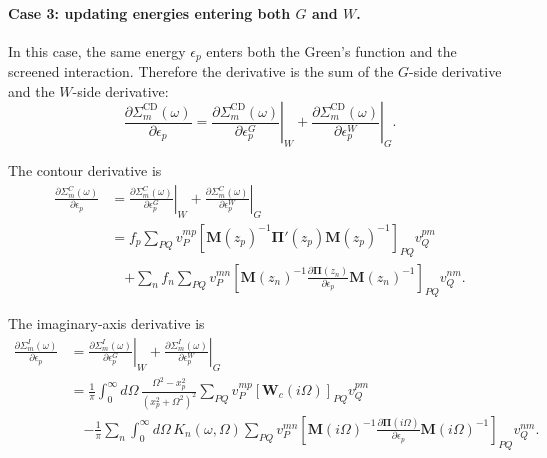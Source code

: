 \paragraph{Case 3: updating energies entering both \(G\) and \(W\).}

In this case, the same energy \(\epsilon_p\) enters both the Green's function
and the screened interaction.  Therefore the derivative is the sum of the
\(G\)-side derivative and the \(W\)-side derivative:
\begin{equation}
    \boxed{
    \frac{\partial \Sigma_m^{\mathrm{CD}}(\omega)}
    {\partial \epsilon_p}
    =
    \left.
    \frac{\partial \Sigma_m^{\mathrm{CD}}(\omega)}
    {\partial \epsilon_p^G}
    \right|_{W}
    +
    \left.
    \frac{\partial \Sigma_m^{\mathrm{CD}}(\omega)}
    {\partial \epsilon_p^W}
    \right|_{G}
    }.
\end{equation}

The contour derivative is
\begin{align}
    \frac{\partial \Sigma_m^C(\omega)}
    {\partial \epsilon_p}
    &=
    \left.
    \frac{\partial \Sigma_m^C(\omega)}
    {\partial \epsilon_p^G}
    \right|_{W}
    +
    \left.
    \frac{\partial \Sigma_m^C(\omega)}
    {\partial \epsilon_p^W}
    \right|_{G} \\
    &=
    \boxed{
    f_p
    \sum_{PQ}
    v_P^{mp}
    \left[
    \mathbf M(z_p)^{-1}
    \boldsymbol{\Pi}'(z_p)
    \mathbf M(z_p)^{-1}
    \right]_{PQ}
    v_Q^{pm}
    } \nonumber \\
    &\quad
    \boxed{
    +
    \sum_n f_n
    \sum_{PQ}
    v_P^{mn}
    \left[
    \mathbf M(z_n)^{-1}
    \frac{\partial \boldsymbol{\Pi}(z_n)}
    {\partial \epsilon_p}
    \mathbf M(z_n)^{-1}
    \right]_{PQ}
    v_Q^{nm}
    }.
\end{align}

The imaginary-axis derivative is
\begin{align}
    \frac{\partial \Sigma_m^I(\omega)}
    {\partial \epsilon_p}
    &=
    \left.
    \frac{\partial \Sigma_m^I(\omega)}
    {\partial \epsilon_p^G}
    \right|_{W}
    +
    \left.
    \frac{\partial \Sigma_m^I(\omega)}
    {\partial \epsilon_p^W}
    \right|_{G} \\
    &=
    \boxed{
    \frac{1}{\pi}
    \int_0^\infty d\Omega\,
    \frac{\Omega^2-x_p^2}
    {\left(x_p^2+\Omega^2\right)^2}
    \sum_{PQ}
    v_P^{mp}
    \left[
    \mathbf W_c(i\Omega)
    \right]_{PQ}
    v_Q^{pm}
    } \nonumber \\
    &\quad
    \boxed{
    -
    \frac{1}{\pi}
    \sum_n
    \int_0^\infty d\Omega\,
    K_n(\omega,\Omega)
    \sum_{PQ}
    v_P^{mn}
    \left[
    \mathbf M(i\Omega)^{-1}
    \frac{\partial \boldsymbol{\Pi}(i\Omega)}
    {\partial \epsilon_p}
    \mathbf M(i\Omega)^{-1}
    \right]_{PQ}
    v_Q^{nm}
    }.
\end{align}

